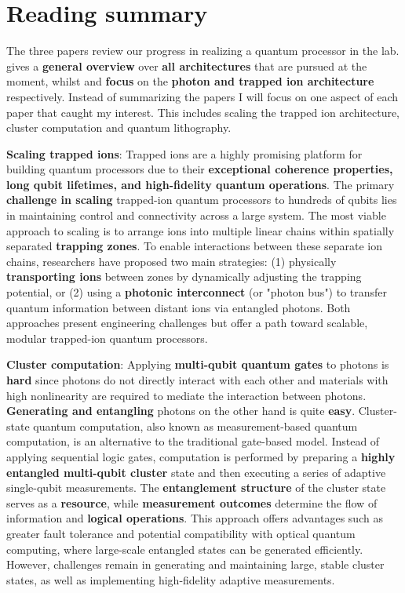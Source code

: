 \documentclass{alex_summary}
\begin{document}
\section*{Reading summary}

The three papers \autocite{monroe_scaling_2013,ladd_quantum_2010,obrien_optical_2007} review our progress in realizing a quantum processor in the lab. \autocite{ladd_quantum_2010} gives a \textbf{general overview} over \textbf{all architectures} that are pursued at the moment, whilst \autocite{monroe_scaling_2013} and \autocite{obrien_optical_2007} \textbf{focus} on the \textbf{photon and trapped ion architecture} respectively. Instead of summarizing the papers I will focus on one aspect of each paper that caught my interest. This includes scaling the trapped ion architecture, cluster computation and quantum lithography.

\textbf{Scaling trapped ions}: Trapped ions are a highly promising platform for building quantum processors due to their \textbf{exceptional coherence properties, long qubit lifetimes, and high-fidelity quantum operations}. The primary \textbf{challenge in scaling} trapped-ion quantum processors to hundreds of qubits lies in maintaining control and connectivity across a large system. The most viable approach to scaling is to arrange ions into multiple linear chains within spatially separated \textbf{trapping zones}. To enable interactions between these separate ion chains, researchers have proposed two main strategies: (1) physically \textbf{transporting ions} between zones by dynamically adjusting the trapping potential, or (2) using a \textbf{photonic interconnect} (or "photon bus") to transfer quantum information between distant ions via entangled photons. Both approaches present engineering challenges but offer a path toward scalable, modular trapped-ion quantum processors.

\textbf{Cluster computation}: Applying \textbf{multi-qubit quantum gates} to photons is \textbf{hard} since photons do not directly interact with each other and materials with high nonlinearity are required to mediate the interaction between photons. \textbf{Generating and entangling} photons on the other hand is quite \textbf{easy}. Cluster-state quantum computation, also known as measurement-based quantum computation, is an alternative to the traditional gate-based model. Instead of applying sequential logic gates, computation is performed by preparing a \textbf{highly entangled multi-qubit cluster} state and then executing a series of adaptive single-qubit measurements. The \textbf{entanglement structure} of the cluster state serves as a \textbf{resource}, while \textbf{measurement outcomes} determine the flow of information and \textbf{logical operations}. This approach offers advantages such as greater fault tolerance and potential compatibility with optical quantum computing, where large-scale entangled states can be generated efficiently. However, challenges remain in generating and maintaining large, stable cluster states, as well as implementing high-fidelity adaptive measurements.
\end{document}
